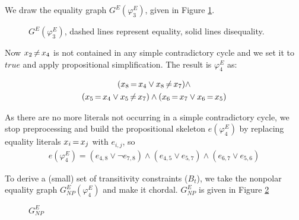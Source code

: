 \documentclass[11pt,a4paper]{uebung}
\begin{document}
{  We draw the equality graph $G^E(\varphi^E_3)$, given in Figure \ref{fig:sp2}.

  \begin{figure}[h]
    \centering
    \caption{$G^E(\varphi^E_3)$, dashed lines represent equality, solid lines disequality.}
    \label{fig:sp2}
  \end{figure}

  Now $x_2 \,{\neq}\, x_4$ is not contained in any simple contradictory cycle and
  we set it to $true$ and apply propositional simplification. The result is
  $\varphi^E_4$ as:

  \begin{gather*}
    ( x_8 \,{=}\, x_4 \lor x_8 \,{\neq}\, x_7 ) \land \\
    ( x_5 \,{=}\, x_4 \lor x_5 \,{\neq}\, x_7 ) \land 
    ( x_6 \,{=}\, x_7 \lor x_6 \,{=}\, x_5)
  \end{gather*}



  As there are no more literals not occurring in a simple contradictory cycle,
  we stop preprocessing and build the propositional skeleton $e(\varphi^E_4)$ by
  replacing equality literals $x_i \,{=}\, x_j$ with $e_{i,j}$, so
  \begin{gather*}
    e(\varphi^E_4) = (e_{4,8} \lor \neg e_{7,8}) \land 
    (e_{4,5} \lor e_{5,7}) \land
    (e_{6,7} \lor e_{5,6})
  \end{gather*}

  To derive a (small) set of transitivity constraints ($B_t$), we take the nonpolar
  equality graph $G^E_{NP}(\varphi^E_4)$ and make it chordal. $G^E_{NP}$ is
  given in Figure \ref{fig:sp3}

  \begin{figure}[h]
    \centering
    \caption{$G^E_{NP}$}
    \label{fig:sp3}
  \end{figure}
  
}
\end{document}
